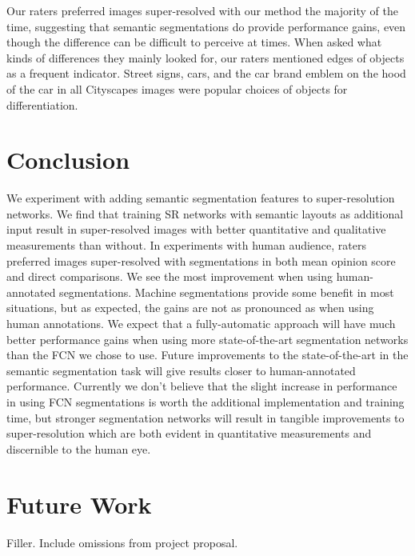 \documentclass[10pt,twocolumn,letterpaper]{article}
\begin{document}
Our raters preferred images super-resolved with our method the majority of the
time, suggesting that semantic segmentations do provide performance gains, even
though the difference can be difficult to perceive at times. When asked what
kinds of differences they mainly looked for, our raters mentioned edges of
objects as a frequent indicator. Street signs, cars, and the car brand emblem
on the hood of the car in all Cityscapes images were popular choices of objects
for differentiation.


\section{Conclusion}
\label{sec:conclusion}
We experiment with adding semantic segmentation features to super-resolution
networks. We find that training SR networks with semantic layouts as additional
input result in super-resolved images with better quantitative and qualitative
measurements than without. In experiments with human audience, raters preferred
images super-resolved with segmentations in both mean opinion score and direct
comparisons. We see the most improvement when using human-annotated
segmentations. Machine segmentations provide some benefit in most situations,
but as expected, the gains are not as pronounced as when using human
annotations. We expect that a fully-automatic approach will have much better
performance gains when using more state-of-the-art segmentation networks than
the FCN we chose to use. Future improvements to the state-of-the-art in the
semantic segmentation task will give results closer to human-annotated
performance. Currently we don't believe that the slight increase in performance
in using FCN segmentations is worth the additional implementation and training
time, but stronger segmentation networks will result in tangible improvements
to super-resolution which are both evident in quantitative measurements and
discernible to the human eye.


\section{Future Work}
Filler. Include omissions from project proposal.

{\small


}
\end{document}
